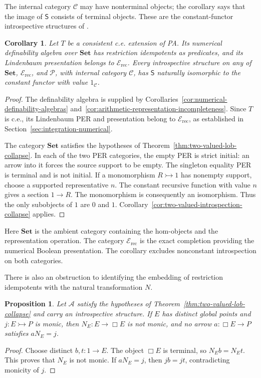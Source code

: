 \documentclass[11pt]{article}
\newtheorem{proposition}[theorem]{Proposition}
\newtheorem{corollary}[theorem]{Corollary}
\theoremstyle{definition}
\theoremstyle{remark}
\begin{document}
The internal category $\mathcal C$ may have nonterminal objects;
the corollary says that the image of $\mathsf S$ consists of terminal
objects. These are the constant-functor introspective structures
of \cite[Example~2.4]{Ramesh}.

\begin{corollary}\label{cor:numerical-introspection-separation}
Let $T$ be a consistent c.e. extension of PA. Its numerical
definability algebra over $\mathbf{Set}$ has restriction idempotents as predicates,
and its Lindenbaum presentation belongs to
$\mathcal E_{\mathrm{rec}}$.
Every introspective structure on any of
$\mathbf{Set}$, $\mathcal E_{\mathrm{rec}}$, and $\mathcal P$,
with internal category $\mathcal C$, has $\mathsf S$ naturally
isomorphic to the constant functor with value
$1_{\mathcal C}$.
\end{corollary}
\begin{proof}
The definability algebra is supplied by
Corollaries~\ref{cor:numerical-definability-algebras}
and~\ref{cor:arithmetic-representation-incompleteness}.
Since $T$ is c.e., its Lindenbaum PER and presentation belong
to $\mathcal E_{\mathrm{rec}}$, as established in
Section~\ref{sec:integration-numerical}.

The category $\mathbf{Set}$ satisfies the hypotheses of
Theorem~\ref{thm:two-valued-lob-collapse}. In each of the two
PER categories, the empty PER is strict initial: an arrow into
it forces the source support to be empty. The singleton equality
PER is terminal and is not initial. If a monomorphism
$R\rightarrowtail1$ has nonempty support, choose a supported
representative $n$. The constant recursive function with value
$n$ gives a section $1\to R$. The monomorphism is consequently
an isomorphism. Thus the only subobjects of $1$ are $0$ and $1$.
Corollary~\ref{cor:two-valued-introspection-collapse} applies.
\end{proof}

Here $\mathbf{Set}$ is the ambient category containing the
hom-objects and the representation operation. The category
$\mathcal E_{\mathrm{rec}}$ is the exact completion providing
the numerical Boolean presentation. The corollary excludes
nonconstant introspection on both categories.

There is also an obstruction to identifying the embedding of restriction idempotents
with the natural transformation $N$.

\begin{proposition}\label{prop:domain-embedding-not-introspection}
Let $\mathcal A$ satisfy the hypotheses of
Theorem~\ref{thm:two-valued-lob-collapse} and carry an
introspective structure. If $E$ has distinct global points and
$j:E\rightarrowtail P$ is monic, then $N_E:E\to\Box E$
is not monic, and no arrow $a:\Box E\to P$ satisfies
$aN_E=j$.
\end{proposition}
\begin{proof}
Choose distinct $b,t:1\to E$. The object $\Box E$ is terminal,
so $N_Eb=N_Et$. This proves that $N_E$ is not monic.
If $aN_E=j$, then $jb=jt$, contradicting monicity of $j$.
\end{proof}
\end{document}
